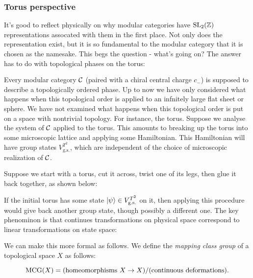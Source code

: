 \begin{ex}
\end{ex}

\subsubsection{Torus perspective}


It's good to reflect physically on why modular categories have $\operatorname{SL}_2({\mathbb Z})$ representations assocated with them in the first place. Not only does the representation exist, but it is so fundamental to the modular category that it is chosen as the namesake. This begs the question - what's going on? The answer has to do with topological phases on the torus:


Every modular category ${\mathcal C}$ (paired with a chiral central charge $c_-$) is supposed to describe a topologically ordered phase. Up to now we have only considered what happens when this topological order is applied to an infnitely large flat sheet or sphere. We have not examined what happens when this topological order is put on a space with nontrivial topology. For instance, the torus. Suppose we analyse the system of ${\mathcal C}$ applied to the torus. This amounts to breaking up the torus into some microscopic lattice and applying some Hamiltonian. This Hamiltonian will have group states $V_{\text{g.s.}}^{T^2}$, which are independent of the choice of microscopic realization of ${\mathcal C}$.

Suppose we start with a torus, cut it across, twist one of its legs, then glue it back together, as shown below:


If the initial torus has some state $\ket{\psi}\in V_{\text{g.s.}}^{T^2}$ on it, then applying this procedure would give back another group state, though possibly a different one. The key phenominon is that continues transformations on physical space correspond to linear transformations on state space:


We can make this more formal as follows. We define the {\em mapping class group} of a topological space $X$ as follows:

$$\operatorname{MCG}(X)=(\text{homeomorphisms $X\to X$})/(\text{continuous deformations}).$$

